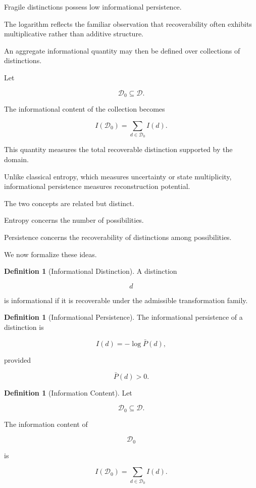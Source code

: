 \documentclass[12pt,oneside]{article}
\theoremstyle{definition}
\newtheorem{definition}[theorem]{Definition} \newtheorem{axiom}[theorem]{Axiom} \newtheorem{remark}[theorem]{Remark} \newtheorem{example}[theorem]{Example}
\begin{document}
Fragile distinctions possess low informational persistence.

The logarithm reflects the familiar observation that recoverability often exhibits multiplicative rather than additive structure.

An aggregate informational quantity may then be defined over collections of distinctions.

Let

\[
\mathcal D_0
\subseteq
\mathcal D.
\]

The informational content of the collection becomes

\[
I(\mathcal D_0)
=
\sum_{d\in\mathcal D_0}
I(d).
\]

This quantity measures the total recoverable distinction supported by the domain.

Unlike classical entropy, which measures uncertainty or state multiplicity, informational persistence measures reconstruction potential.

The two concepts are related but distinct.

Entropy concerns the number of possibilities.

Persistence concerns the recoverability of distinctions among possibilities.

We now formalize these ideas.

\begin{definition}[Informational Distinction]

A distinction

\[
d
\]

is informational if it is recoverable under the admissible transformation family.

\end{definition}

\begin{definition}[Informational Persistence]

The informational persistence of a distinction is

\[
I(d)
=
-\log \bar P(d),
\]

provided

\[
\bar P(d)>0.
\]

\end{definition}

\begin{definition}[Information Content]

Let

\[
\mathcal D_0
\subseteq
\mathcal D.
\]

The information content of

\[
\mathcal D_0
\]

is

\[
I(\mathcal D_0)
=
\sum_{d\in\mathcal D_0}
I(d).
\]

\end{definition}
\end{document}

